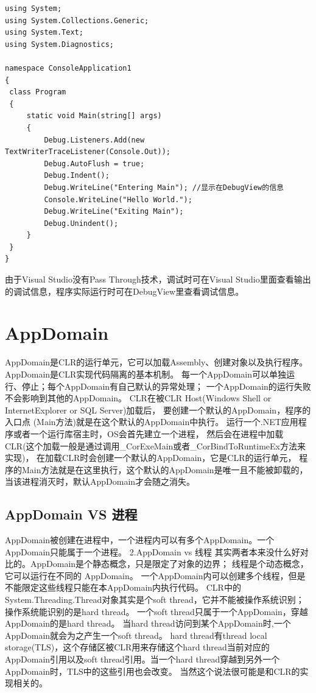 \documentclass{book}
\begin{document}
\begin{lstlisting}[language={[Sharp]C}]
using System;
using System.Collections.Generic;
using System.Text;
using System.Diagnostics;

namespace ConsoleApplication1
{
 class Program
 {
     static void Main(string[] args)
     {
         Debug.Listeners.Add(new TextWriterTraceListener(Console.Out));
         Debug.AutoFlush = true;
         Debug.Indent();
         Debug.WriteLine("Entering Main"); //显示在DebugView的信息
         Console.WriteLine("Hello World.");
         Debug.WriteLine("Exiting Main");
         Debug.Unindent();
     }
 }
}
\end{lstlisting}

由于Visual Studio没有Pass Through技术，调试时可在Visual Studio里面查看输出的调试信息，程序实际运行时可在DebugView里查看调试信息。

\section{AppDomain}

AppDomain是CLR的运行单元，它可以加载Assembly、创建对象以及执行程序。
AppDomain是CLR实现代码隔离的基本机制。
每一个AppDomain可以单独运行、停止；每个AppDomain有自己默认的异常处理；
一个AppDomain的运行失败不会影响到其他的AppDomain。
CLR在被CLR Host(Windows Shell or InternetExplorer or SQL Server)加载后，
要创建一个默认的AppDomain，程序的入口点
(Main方法)就是在这个默认的AppDomain中执行。
运行一个.NET应用程序或者一个运行库宿主时，OS会首先建立一个进程，
然后会在进程中加载CLR(这个加载一般是通过调用\_CorExeMain或者\_CorBindToRuntimeEx方法来实现)，
在加载CLR时会创建一个默认的AppDomain，它是CLR的运行单元，
程序的Main方法就是在这里执行，这个默认的AppDomain是唯一且不能被卸载的，当该进程消灭时，默认AppDomain才会随之消失。

\subsection{AppDomain VS 进程}

AppDomain被创建在进程中，一个进程内可以有多个AppDomain。一个AppDomain只能属于一个进程。
2.AppDomain vs 线程
其实两者本来没什么好对比的。AppDomain是个静态概念，只是限定了对象的边界；
线程是个动态概念，它可以运行在不同的
AppDomain。
一个AppDomain内可以创建多个线程，但是不能限定这些线程只能在本AppDomain内执行代码。
CLR中的System.Threading.Thread对象其实是个soft thread，它并不能被操作系统识别；操作系统能识别的是hard thread。
一个soft thread只属于一个AppDomain，穿越AppDomain的是hard thread。
当hard thread访问到某个AppDomain时,一个
AppDomain就会为之产生一个soft thread。
hard thread有thread local storage(TLS)，这个存储区被CLR用来存储这个hard thread当前对应的AppDomain引用以及soft
thread引用。当一个hard thread穿越到另外一个AppDomain时，TLS中的这些引用也会改变。
当然这个说法很可能是和CLR的实现相关的。
\end{document}
